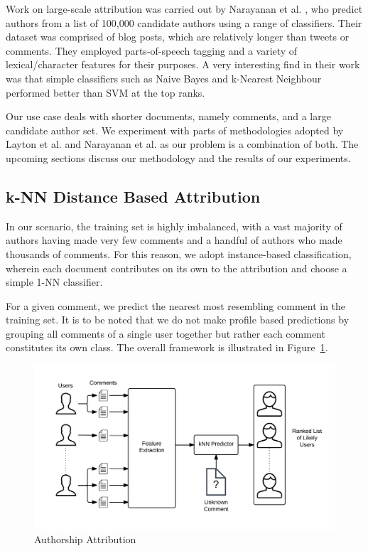 Work on large-scale attribution was carried out by Narayanan et al. \cite{narayanan_feasibility_2012}, who predict authors from a list of 100,000 candidate authors using a range of classifiers. Their dataset was comprised of blog posts, which are relatively longer than tweets or comments. They employed parts-of-speech tagging and a variety of lexical/character features for their purposes. A very interesting find in their work was that simple classifiers such as Naive Bayes and k-Nearest Neighbour performed better than SVM at the top ranks.

Our use case deals with shorter documents, namely comments, and a large candidate author set. We experiment with parts of methodologies adopted by Layton et al. \cite{layton_authorship_2010} and Narayanan et al. \cite{narayanan_feasibility_2012} as our problem is a combination of both. The upcoming sections discuss our methodology and the results of our experiments.

\subsection{k-NN Distance Based Attribution}
In our scenario, the training set is highly imbalanced, with a vast majority of authors having made very few comments and a handful of authors who made thousands of comments. For this reason, we adopt instance-based classification, wherein each document contributes on its own to the attribution and choose a simple 1-NN classifier.

For a given comment, we predict the nearest most resembling comment in the training set. It is to be noted that we do not make profile based predictions by grouping all comments of a single user together but rather each comment constitutes its own class. The overall framework is illustrated in Figure~\ref{fig:inv_1}.

\begin{figure}[!h]
\centering
\includegraphics[width=1\textwidth]{c-inv_images/inv_1.png}
\caption{Authorship Attribution}
\label{fig:inv_1}
\end{figure}

